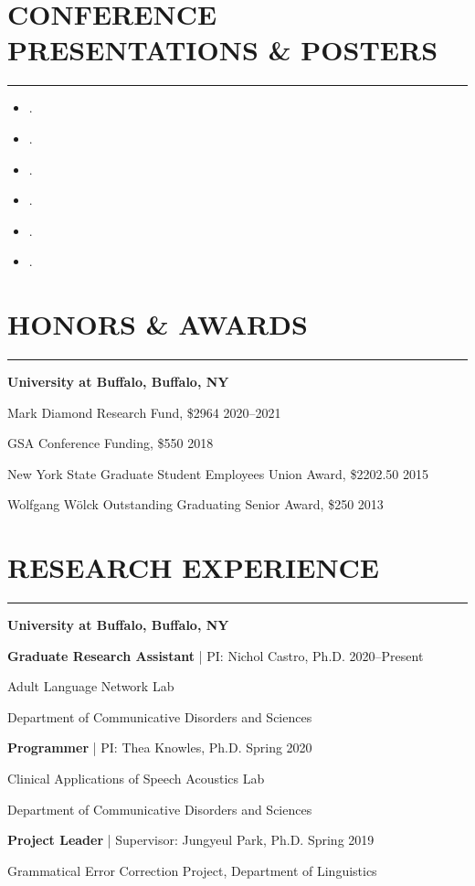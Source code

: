 \documentclass[11pt]{article}
\newcommand{\cvsection}[1]{\vspace{-0.2cm}\section*{\Large #1}\vspace{-0.2cm}\hrule\vspace{0.2cm}}
\newcommand{\h}[1]{\hspace{15pt} #1}
\begin{document}
\cvsection{CONFERENCE PRESENTATIONS \& POSTERS}

\begin{itemize}[leftmargin=!,labelindent=!,itemindent=-18pt]
    \setlength\itemsep{0.3em}

    \item[] .
    \item[] .
    \item[] .
    \item[] .
    \item[] .
    \item[] .

\end{itemize}



\cvsection{HONORS \& AWARDS}

\textbf{\large University at Buffalo, Buffalo, NY}

Mark Diamond Research Fund, \$2964 \hfill 2020--2021

GSA Conference Funding, \$550 \hfill 2018

New York State Graduate Student Employees Union Award, \$2202.50 \hfill 2015

Wolfgang W{\"o}lck Outstanding Graduating Senior Award, \$250 \hfill 2013



\cvsection{RESEARCH EXPERIENCE}

\textbf{\large University at Buffalo, Buffalo, NY}

\textbf{Graduate Research Assistant} | PI: Nichol Castro, Ph.D. \hfill 2020--Present

\h{Adult Language Network Lab}

\h{Department of Communicative Disorders and Sciences}

\textbf{Programmer} | PI: Thea Knowles, Ph.D. \hfill Spring 2020

\h{Clinical Applications of Speech Acoustics Lab}

\h{Department of Communicative Disorders and Sciences}

\textbf{Project Leader} | Supervisor: Jungyeul Park, Ph.D. \hfill Spring 2019

\h{Grammatical Error Correction Project, Department of Linguistics}
\end{document}
